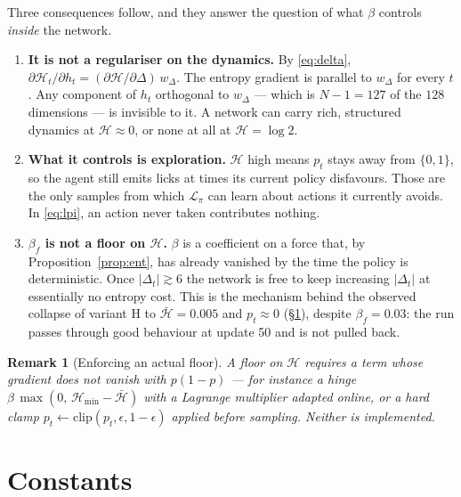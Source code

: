 \documentclass[11pt]{article}
\newtheorem{remark}{Remark}
\newcommand{\1}{\mathbf{1}}
\begin{document}
\noindent Three consequences follow, and they answer the question of what $\beta$ controls
\emph{inside} the network.

\begin{enumerate}
  \item \textbf{It is not a regulariser on the dynamics.} By \eqref{eq:delta},
        $\partial \mathcal{H}_t/\partial h_t = (\partial\mathcal{H}/\partial\Delta)\, w_\Delta$.
        The entropy gradient is parallel to $w_\Delta$ for every $t$. Any component of $h_t$
        orthogonal to $w_\Delta$ --- which is $N-1 = 127$ of the $128$ dimensions --- is
        invisible to it. A network can carry rich, structured dynamics at
        $\mathcal{H}\approx 0$, or none at all at $\mathcal{H} = \log 2$.
  \item \textbf{What it controls is exploration.} $\mathcal{H}$ high means $p_t$ stays away
        from $\{0,1\}$, so the agent still emits licks at times its current policy disfavours.
        Those are the only samples from which $\mathcal{L}_\pi$ can learn about actions it
        currently avoids. In \eqref{eq:lpi}, an action never taken contributes nothing.
  \item \textbf{$\beta_{\!f}$ is not a floor on $\mathcal{H}$.} $\beta$ is a coefficient on a
        force that, by Proposition~\ref{prop:ent}, has already vanished by the time the policy
        is deterministic. Once $|\Delta_t| \gtrsim 6$ the network is free to keep increasing
        $|\Delta_t|$ at essentially no entropy cost. This is the mechanism behind the observed
        collapse of variant H to $\bar{\mathcal{H}} = 0.005$ and $p_t \approx 0$
        (\S\ref{sec:consts}), despite $\beta_{\!f} = 0.03$: the run passes through good
        behaviour at update 50 and is not pulled back.
\end{enumerate}

\begin{remark}[Enforcing an actual floor]
A floor on $\mathcal{H}$ requires a term whose gradient does \emph{not} vanish with
$p(1-p)$ --- for instance a hinge $\beta\,\max(0,\, \mathcal{H}_{\min} - \bar{\mathcal{H}})$
with a Lagrange multiplier adapted online, or a hard clamp $p_t \leftarrow
\mathrm{clip}(p_t, \epsilon, 1-\epsilon)$ applied before sampling. Neither is implemented.
\end{remark}

\section{Constants}\label{sec:consts}
\end{document}
